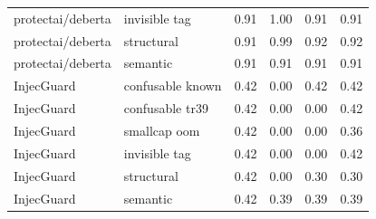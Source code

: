 \begin{table}[ht]
\begin{tabular}{ll cccc}
protectai/deberta & invisible tag & 0.91 & 1.00 & 0.91 & 0.91 \\
protectai/deberta & structural & 0.91 & 0.99 & 0.92 & 0.92 \\
protectai/deberta & semantic & 0.91 & 0.91 & 0.91 & 0.91 \\
InjecGuard & confusable known & 0.42 & 0.00 & 0.42 & 0.42 \\
InjecGuard & confusable tr39 & 0.42 & 0.00 & 0.00 & 0.42 \\
InjecGuard & smallcap oom & 0.42 & 0.00 & 0.00 & 0.36 \\
InjecGuard & invisible tag & 0.42 & 0.00 & 0.00 & 0.42 \\
InjecGuard & structural & 0.42 & 0.00 & 0.30 & 0.30 \\
InjecGuard & semantic & 0.42 & 0.39 & 0.39 & 0.39 \\
\bottomrule
\end{tabular}
\end{table}
